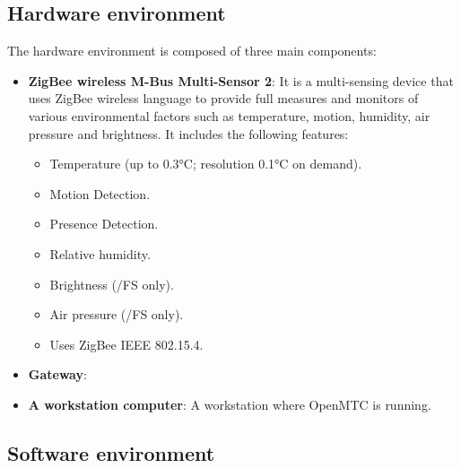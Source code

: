 \subsection{Hardware environment}
The hardware environment is composed of three main components:
\begin{itemize}
\item \textbf{ZigBee wireless M-Bus Multi-Sensor 2}:
It is a multi-sensing device that uses ZigBee wireless language to provide full measures and monitors of various environmental factors such as temperature, motion, humidity, air pressure and brightness. It includes the following features:
\begin{itemize}
    \item Temperature (up to 0.3°C; resolution 0.1°C on demand).
    \item Motion Detection.
    \item Presence Detection.
    \item Relative humidity.
    \item Brightness (/FS only).
    \item Air pressure (/FS only).
    \item Uses ZigBee IEEE 802.15.4.
\end{itemize}
\item \textbf{Gateway}:
\item \textbf{A workstation computer}:
A workstation where OpenMTC is running.
\end{itemize}

\subsection{Software environment}


